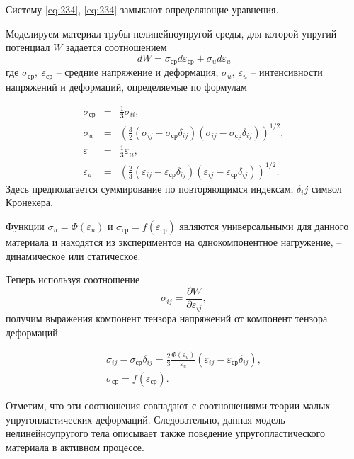 \documentclass[specialist, subf, href, colorlinks=true, 14pt, final]{disser}
\theoremstyle{definition}
\newcommand{\pdfrac}[2]{\frac{\partial #1}{\partial #2}}
\begin{document}
Систему \eqref{eq:234}, \eqref{eq:234} замыкают определяющие уравнения.

Моделируем материал трубы нелинейноупругой среды, для которой упругий потенциал $W$ задается соотношением
\[
	dW = \sigma_{\text{ср}}d\varepsilon_{\text{ср}} + \sigma_{u}d\varepsilon_u
\]
где $\sigma_{\text{ср}},\ \varepsilon_{\text{ср}}$ -- средние напряжение и деформация; $\sigma_{u},\ \varepsilon_{u}$ -- интенсивности напряжений и деформаций, определяемые по формулам
\addtocounter{equation}{1}
\begin{equation}\label{eq:236}
		\begin{array}{lll}
			\sigma_{\text{ср}} &=& \displaystyle \frac{1}{3} \sigma_{ii},\\
			\sigma_u &=& \left(\displaystyle \frac{3}{2} (\sigma_{ij} - \sigma_{\text{ср}}\delta_{ij})(\sigma_{ij} - \sigma_{\text{ср}}\delta_{ij}) \right)^{1/2},\\
			\varepsilon_{} &=& \displaystyle \frac{1}{3} \varepsilon_{ii},\\
			\varepsilon_u &=& \left(\displaystyle  \frac{2}{3} (\varepsilon_{ij} - \varepsilon_{\text{ср}}\delta_{ij})(\varepsilon_{ij} - \varepsilon_{\text{ср}}\delta_{ij}) \right)^{1/2}.
		\end{array}
  	\tag{6}
\end{equation}
Здесь предполагается суммирование по повторяющимся индексам, $\delta_ij$ символ Кронекера.

Функции $\sigma_{u} = \Phi(\varepsilon_{u})$ и $\sigma_{\text{ср}} = f(\varepsilon_{\text{ср}})$ являются универсальными для данного материала и находятся из экспериментов на однокомпонентное нагружение, -- динамическое или статическое.

Теперь используя соотношение
\[ 
  \sigma_{ij} = \pdfrac{W}{\varepsilon_{ij}},
\]
получим выражения компонент тензора напряжений от компонент тензора деформаций
\addtocounter{equation}{1}
\begin{equation}\label{eq:237}
		\begin{array}{l}
			\sigma_{ij} - \sigma_{\text{ср}}\delta_{ij} =\displaystyle  \frac{2}{3} \frac{\Phi(\varepsilon_u)}{\varepsilon_u} (\varepsilon_{ij} - \varepsilon_{\text{ср}}\delta_{ij}), \\
			\sigma_{\text{ср}} = f(\varepsilon_{\text{ср}}).
		\end{array}
  	\tag{7}
\end{equation}
	
Отметим, что эти соотношения совпадают с соотношениями теории малых упругопластических деформаций. Следовательно, данная модель нелинейноупругого тела описывает также поведение упругопластического материала в активном процессе.
\end{document}
